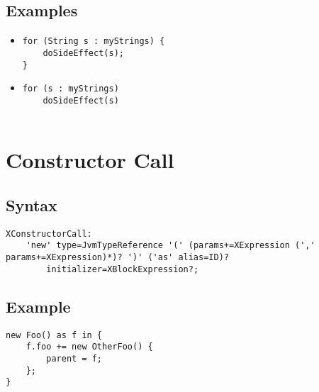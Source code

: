 \documentclass[a4paper,10pt]{scrreprt}
\newlength{\itemindentlen}
\begin{document}
\subsection{Examples}


\setlength{\itemindentlen}{\textwidth}
\begin{itemize}
\addtolength{\itemindentlen}{-2em}

\item \begin{minipage}[t]{\itemindentlen}\vspace*{-\baselineskip}
\begin{lstlisting}
for (String s : myStrings) {
	doSideEffect(s);
}
\end{lstlisting}

\end{minipage}

\item \begin{minipage}[t]{\itemindentlen}\vspace*{-\baselineskip}

		\begin{lstlisting}
for (s : myStrings)
	doSideEffect(s)
		
\end{lstlisting}

	
\end{minipage}

\end{itemize}
\addtolength{\itemindentlen}{2em}







\section{Constructor Call}
\label{ConstructorCall}


\subsection{Syntax}

\begin{lstlisting}
XConstructorCall:
	'new' type=JvmTypeReference '(' (params+=XExpression (',' params+=XExpression)*)? ')' ('as' alias=ID)?
		initializer=XBlockExpression?;

\end{lstlisting}





\subsection{Example}

\begin{lstlisting}
new Foo() as f in {
	f.foo += new OtherFoo() {
		parent = f;
	};
}

\end{lstlisting}
\end{document}
